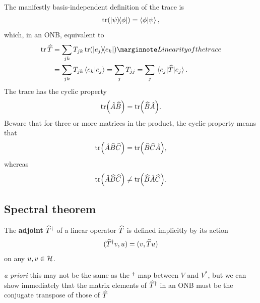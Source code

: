 \vspace{0.5em}
The manifestly basis-independent definition of the trace is 
\begin{align}
	\tr(\dyad{\psi}{\phi}) = \av{\phi|\psi},
\end{align}
which, in an ONB, equivalent to
\begin{align}
	\tr \op T &= \sum_{jk} T_{jk} \tr(\dyad{e_j}{e_k}) \mnf{Linearity of the trace} \\
	&= \sum_{jk}T_{jk} \av{e_k|e_j} = \sum_j T_{jj} = \sum_j \expval{\op T}{e_j}.
\end{align}
The trace has the cyclic property
\begin{align}
	\tr(\hat A \widehat{B}) = \tr(\widehat{B} \hat A).
\end{align}
Beware that for three or more matrices in the product, the cyclic property means that
\begin{align}
	\tr(\hat A \widehat{B} \widehat{C}) = \tr(\widehat{B} \widehat{C} \hat A),
\end{align}
whereas
\begin{align}
	\tr(\hat A \widehat{B} \widehat{C}) \neq \tr(\widehat{B} \hat A \widehat{C}).
\end{align}

\subsection{Spectral theorem}

\begin{definition}
	The {\bf adjoint} $\widehat{T}^{\dagger}$ of a linear operator $\widehat{T}$ is defined implicitly by its action
	\begin{align}\label{eq:adjoint-def}
	(\widehat{T}^{\dagger} v,u) = (v,\widehat{T}u)	
	\end{align}
	on any $u,v\in \mathcal{H}$.
\end{definition}
\noindent \emph{a priori} this may not be the same as the $^{\dagger}$ map between $V$ and $V^*$, but we can show immediately that the matrix elements of $\widehat{T}^{\dagger}$ in an ONB must be the conjugate transpose of those of $\widehat{T}$

